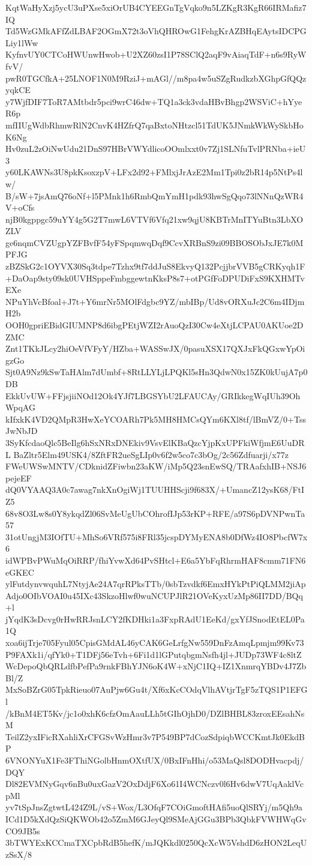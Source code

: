 KqtWaHyXzj5ycU3uPXse5xiOrUB4CYEEGnTgVqko9n5LZKgR3KgR66IRMafiz7IQ
Td5WzGMkAFfZdLBAF2OGmX72t3oVhQHROwG1FehgKrAZBHqEAytsIDCPGLiy1lWw
KyfnvUY0CTCoHWUnwHwob+U2XZ60zsI1P78SClQ2aqF9vAiaqTdF+n6s9RyWfvV/
pwR0TGCfkA+25LNOF1N0M9RziJ+mAGl//m8pa4w5uSZgRudkzbXGhpGfQQzyqkCE
y7WjfDIF7ToR7AMtbdr5pci9wrC46dw+TQ1a3ck3vdaHBvBhgp2WSViC+hYyeR6p
mfIIUgWdbRhmwRlN2CnvK4HZfrQ7qaBxtoNHtzcl51TdUK5JNmkWkWySkbHoK6Ng
Hv0zuL2zOiNwUdu21DnS97HBrVWYdlicoOOmlxxt0v7Zj1SLNfuTvlPRNba+ieU3
y60LKAWNs3U8pkKsoxzpV+LFx2d92+FMlxjJrAzE2Mm1Tpi0z2bR14p5NtPs4lw/
B/sW+7jsAmQ76oNf+l5PMnk1h6RmbQmYmH1pdk93hwSgQqo73lNNnQzWR4V+oCfs
njB0kgppgc59uYY4g5G2T7mwL6VTVf6Vfq21xw9qjU8KBTrMnITYuBtn3LbXOZLV
ge6nqmCVZUgpYZFBvfF54yFSpqmwqDqf9CcvXRBnS9zi09BBOSObJxJE7k0MPFJG
zBZSkG2c1OYVX30Sq3tdpe7Tzhx9tf7ddJuS8EkvyQ132PcjjbrVVB5gCRKyqh1F
+DaOap9sty09sk0UVHSppeFmbggewtnKksP8s7+otPGfFoDPUDiFxS9KXHMTvEXe
NPuYhVcBfoal+J7t+Y6mrNr5MOlFdgbc9YZ/mbIBp/Ud8vORXuJc2C6m4IDjmH2b
OOH0gpriEBidGIUMNP8d6ibgPEtjWZI2rAuoQzI30Cw4eXtjLCPAU0AKUoe2DZMC
Znt1TKkJLcy2hiOeVfVFyY/HZba+WASSwJX/0pasuXSX17QXJxFkQGxwYpOigzGo
Sjt0A9Nz9kSwTaHAlm7dUmbf+8RtLLYLjLPQKl5sHn3QdwN0x15ZK0kUujA7p0DB
EkkUvUW+FFjsjiiNOd12Ok4YJf7LBGSYbU2LFAUCAy/GRIkkegWqIUh39OhWpqAG
kIfxkK4VD2QMpR3HwXeYCOARh7Pk5MH8HMCsQYm6KXl8tf/lBmVZ/0+TssJwNbJD
3SyKfcdaoQlc5BeIlg6hSxNRxDNEkiv9VsvElKBaQzcYjpKxUPFkiWfjmE6UuDRL
BaZltr5Elm49USK4/8ZftFR2ueSgLIp0v6f2w5co7c3bOg/2c56Zdfuarji/x77z
FWeUWSwMNTV/CDknidZFiwbn23aKW/iMp5Q23snEwSQ/TRAafxhIB+NSJ6pejeEF
dQ0VYAAQ3A0c7awag7nkXnOgiWj1TUUHHScji9f683X/+UmancZ12ysK68/FtIZ5
68v8O3Lw8s0Y8ykqdZl06SvMeUgUbCOhrofIJp53rKP+RFE/a97S6pDVNPwnTa57
31otUngjM3IOfTU+MhSo6VRf575i8FRl35jcspDYMyENA8b0DfWz4IO8PbcfW7x6
idWPBvPWuMqOiRRP/fhiYvwXd64PvSHtcl+E6a5YbFqRhrmHAF8cmm71FN6eGKEC
ylFutdynvwquhL7NtyjAe24A7qrRPksTTb/0sbTzvdkf6EmxHYkPtPiQLMM2jiAp
Adjo0OIbVOAI0u45IXc43SkzoHlwf0wuNCUPJlR21OVeKyxUzMp86II7DD/BQq+l
jYqdK3sDcvg0rHwRRJsnLCY2fKDHki1a3FxpRAdU1EeKd/gxYfJSnodEtEL0Pa1Q
xoa6ijTrje705Fyul05CpisGMdAL46yCAK6GeLrfgNw559DnFzAmqLpmjm99Kv73
P9FAXk1i/qfYk0+T1DFj56eTvh+6Fi1d1lGPutqbgmNsfh4jl+JUDp73WF4c8ltZ
WcDepoQbQRLdfbPefPa9rnkFBhYJN6oK4W+xNjC1IQ+IZ1XnmrqYBDv4J7ZbBl/Z
MxSoBZrG05TpkRieuo07AuPjw6Gu4t/Xf6xKcCOdqVlhAVtjrTgF5zTQS1P1EFGl
/kBnM4ET5Kv/jc1o0xhK6cfzOmAauLLh5tGIhOjhD0/DZlBHBL83zroxEEsahNsM
TeilZ2yxIFicRXahliXrCFGSvWzHmr3v7P549BP7dCozSdpiqbWCCKmtJk0EkdBP
6VNONYuX1Fe3FThiNGolbHnmOXtfUX/0BxIFnHhi/o53MaQsl8DODHvacpdj/DQY
Dl82EVMNyGqv6nBu0uxGazV2OxDdjF6Xo61I4WCNczv0l6Hv6dwV7UqAaklVcpMl
yv7tSpJnsZgtwtL424Z9L/vS+Wox/L3OfqF7COiGmoftHAfi5uoQlSRYj/m5Qh9a
ICd1D5kXdQzSiQKWOb42o5ZmM6GJeyQl9SMeAjGGu3BPb3QbkFVWHWqGvCO9JB5s
3bTWYExKCCmaTXCpbRdB5hefK/mJQKkdl0250QcXcW5VshdD6zHON2LeqUzSsX/8
